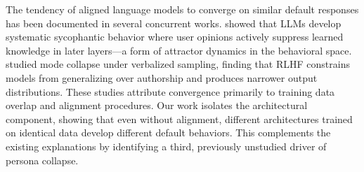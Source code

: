 The tendency of aligned language models to converge on similar default responses has been documented in several concurrent works. \citet{sycophancy2025} showed that LLMs develop systematic sycophantic behavior where user opinions actively suppress learned knowledge in later layers---a form of attractor dynamics in the behavioral space. \citet{mode_collapse2025} studied mode collapse under verbalized sampling, finding that RLHF constrains models from generalizing over authorship and produces narrower output distributions. These studies attribute convergence primarily to training data overlap and alignment procedures. Our work isolates the architectural component, showing that even without alignment, different architectures trained on identical data develop different default behaviors. This complements the existing explanations by identifying a third, previously unstudied driver of persona collapse.
